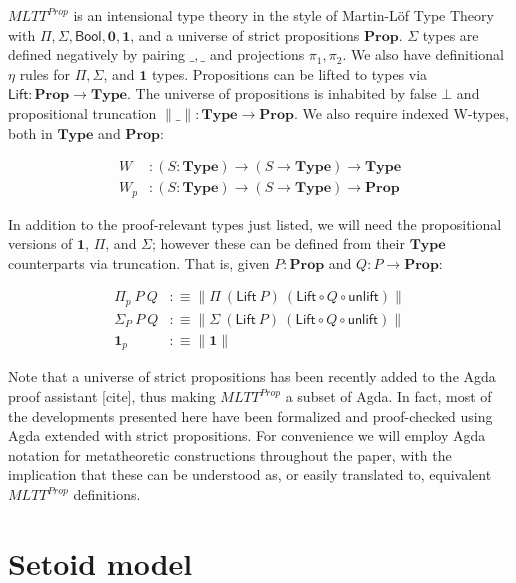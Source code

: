\documentclass{easychair}
\newcommand{\mType}{\mathbf{Type}}
\newcommand{\mProp}{\mathbf{Prop}}
\begin{document}
$MLTT^{Prop}$ is an intensional type theory in the style of Martin-L\"of Type
Theory with $\Pi, \Sigma, \textsf{Bool}, \mathbf{0}, \mathbf{1}$, and a universe
of strict propositions $\mProp$. $\Sigma$ types are defined negatively by
pairing $\_,\_$ and projections $\pi_1, \pi_2$. We also have definitional $\eta$
rules for $\Pi, \Sigma$, and $\mathbf{1}$ types. Propositions can be lifted to
types via $\textsf{Lift} : \mProp \to \mType$. The universe of propositions is
inhabited by false $\bot$ and propositional truncation $\|\_\| : \mType \to
\mProp$. We also require indexed W-types, both in $\mType$ and $\mProp$:

\begin{align*}
  W & : (S : \mType) \to (S \to \mType) \to \mType \\
  W_p & : (S : \mType) \to (S \to \mType) \to \mProp
\end{align*}

In addition to the proof-relevant types just listed, we will need the
propositional versions of $\mathbf{1}$, $\Pi$, and $\Sigma$; however these can
be defined from their $\mType$ counterparts via truncation. That is, given $P :
\mProp$ and $Q : P \to \mProp$:

\begin{align*}
  \Pi_p\ P\ Q & :\equiv \| \Pi\ (\textsf{Lift} \ P)\ (\textsf{Lift} \circ Q \circ \textsf{unlift}) \| \\
  \Sigma_P\ P\ Q & :\equiv \| \Sigma\ (\textsf{Lift} \ P)\ (\textsf{Lift} \circ Q \circ \textsf{unlift}) \| \\
  \mathbf{1}_p & :\equiv \| \mathbf{1} \|
\end{align*}

Note that a universe of strict propositions has been recently added to the Agda
proof assistant [cite], thus making $MLTT^{Prop}$ a subset of Agda. In fact,
most of the developments presented here have been formalized and proof-checked
using Agda extended with strict propositions. For convenience we will employ
Agda notation for metatheoretic constructions throughout the paper, with the
implication that these can be understood as, or easily translated to, equivalent
$MLTT^{Prop}$ definitions.

\section{Setoid model}

\end{document}
